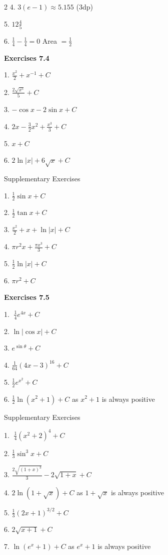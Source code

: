 \begin {multicols}{2}
4. $3 \left (e -1\right ) \approx 5.155$ (3dp) 

5. $12\frac{4}{5}$ 

6. $\frac{1}{4} -\frac{1}{4} =0$ Area $ =\frac{1}{2}$ 

\textbf{Exercises 7.4} 

1. $\frac{x^{2}}{2} +x^{ -1} +C$ 

2. $\frac{2 \sqrt{x^{5}}}{5} +C$ 

3. $ -\cos  x -2 \sin  x +C$ 

4. $2 x -\frac{3}{2} x^{2} +\frac{x^{3}}{3} +C$ 

5. $x +C$ 

6. $2 \ln  \left \vert x\right \vert  +6 \sqrt{x} +C$ 

Supplementary Exercises 

1. $\frac{1}{2} \sin  x +C$ 

2. $\frac{1}{2} \tan  x +C$ 

3. $\frac{x^{2}}{2} +x +\ln  \left \vert x\right \vert  +C$ 

4. $\pi  r^{2} x +\frac{\pi  x^{3}}{3} +C$ 

5. $\frac{1}{2} \ln  \left \vert x\right \vert  +C$ 

6. $\pi  r^{2} +C$ 

\textbf{Exercises 7.5} 

1. $\;\frac{1}{4} e^{4 x} +C$ 

2. $\ln  \left \vert \cos  x\right \vert  +C$ 

3. $e^{\sin  \theta } +C$ 

4. $\frac{1}{64} \left (4 x -3\right )^{16} +C$ 

5. $\frac{1}{2} e^{x^{2}} +C$ 

6. $\frac{1}{2} \ln  \left (x^{2} +1\right ) +C$ as $x^{2} +1$ is always positive 

Supplementary Exercises 

1. $\;\frac{1}{4} \left (x^{2} +2\right )^{4} +C$ 

2. $\frac{1}{3} \sin ^{3} x +C$ 

3. $\frac{2 \sqrt{\left (1 +x\right )^{3}}}{3} -2 \sqrt{1 +x} +C$ 

4. $2 \ln  \left (1 +\sqrt{x}\right ) +C$ as $1 +\sqrt{x}$ is always positive 

5. $\frac{1}{3} \left (2 x +1\right )^{3/2} +C$ 

6. $2 \sqrt{x +1} +C$ 

7. $\ln  \left (e^{x} +1\right ) +C$ as $e^{x} +1$ is always positive 


\end{multicols}

